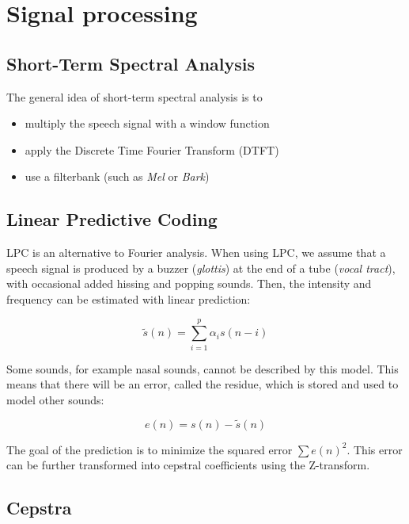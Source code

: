 \documentclass[11pt]{article}
\begin{document}
\section{Signal processing}

\subsection{Short-Term Spectral Analysis}

The general idea of short-term spectral analysis is to

\begin{itemize}
    \item multiply the speech signal with a window function
    \item apply the Discrete Time Fourier Transform (DTFT)
    \item use a filterbank (such as \textit{Mel} or \textit{Bark})
\end{itemize}

\subsection{Linear Predictive Coding}

LPC is an alternative to Fourier analysis. When using LPC, we assume that a speech signal is produced by a buzzer (\textit{glottis}) at the end of a tube (\textit{vocal tract}), with occasional added hissing and popping sounds. Then, the intensity and frequency can be estimated with linear prediction:

\begin{equation}
    \tilde{s}(n) = \sum\limits_{i = 1}^p \alpha_i s(n - i)
\end{equation}

Some sounds, for example nasal sounds, cannot be described by this model. This means that there will be an error, called the residue, which is stored and used to model other sounds:

\begin{equation}
    e(n) = s(n) - \tilde{s}(n)
\end{equation}

The goal of the prediction is to minimize the squared error $\sum e(n)^2$. This error can be further transformed into cepstral coefficients using the Z-transform.

\subsection{Cepstra}
\end{document}
